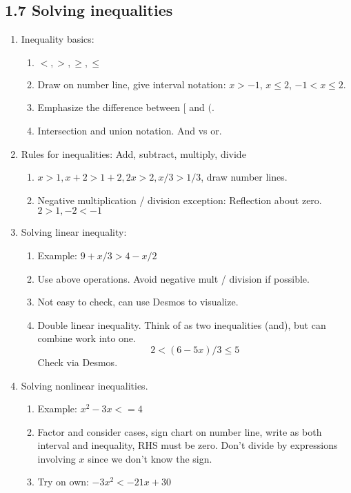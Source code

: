 \documentclass{article}
\begin{document}
\subsection{1.7 Solving inequalities}

\begin{enumerate}
\item Inequality basics:
\begin{enumerate}
\item $<, >, \geq, \leq$
\item Draw on number line, give interval notation: $x>-1$, $x\leq 2$, $-1<x\leq 2$. 
\item Emphasize the difference between $[$ and $($. 
\item Intersection and union notation. And vs or. 
\end{enumerate}

\item Rules for inequalities: Add, subtract, multiply, divide
\begin{enumerate}
\item $x>1, x+2 >1+2, 2x>2, x/3 > 1/3$, draw number lines.
\item Negative multiplication / division exception: Reflection about zero.
$2>1 , -2 < -1$
\end{enumerate}

\item Solving linear inequality: 
\begin{enumerate}
\item Example: $9+x/3 > 4-x/2$
\item Use above operations. Avoid negative mult / division if possible.
\item Not easy to check, can use Desmos to visualize.
\item Double linear inequality. Think of as two inequalities (and), but can combine work into one.
\[
2<  (6-5x)/3  \leq 5
\]
Check via Desmos.
\end{enumerate}

\item Solving nonlinear inequalities.
\begin{enumerate}
\item Example: $x^2-3x<=4$
\item Factor and consider cases, sign chart on number line, write as both interval and inequality, RHS must be zero. Don't divide by expressions involving $x$ since we don't know the sign.
\item Try on own: $-3x^2 < -21x+30$
\end{enumerate}


\end{enumerate}
\end{document}
